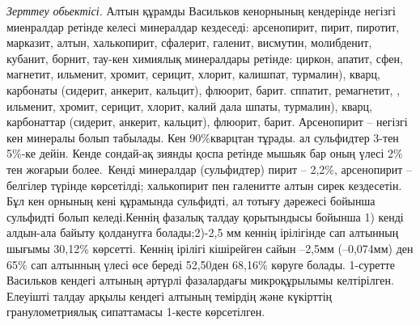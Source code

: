 \begin{multicols}{2}
\emph{Зерттеу обьектісі.} Алтын құрамды Васильков кенорнының кендерінде
негізгі миенралдар ретінде келесі минералдар кездеседі: арсенопирит,
пирит, пиротит, марказит, алтын, халькопирит, сфалерит, галенит,
висмутин, молибденит, кубанит, борнит, тау-кен химиялық минералдары
ретінде: циркон, апатит, сфен, магнетит, ильменит, хромит, серицит,
хлорит, калишпат, турмалин), кварц, карбонаты (сидерит, анкерит,
кальцит), флюорит, барит. сппатит, ремагнетит, , ильменит, хромит,
серицит, хлорит, калий дала шпаты, турмалин), кварц, карбонаттар
(сидерит, анкерит, кальцит), флюорит, барит. Арсенопирит -- негізгі кен
минералы болып табылады. Кен 90\%кварцтан тұрады. ал сульфидтер 3-тен
5\%-ке дейін. Кенде сондай-ақ зиянды қоспа ретінде мышьяк бар оның үлесі
2\% тен жоғарыи более.~Кенді минералдар (сульфидтер) пирит -- 2,2\%,
арсенопирит -- белгілер түрінде көрсетілді; халькопирит пен галенитте
алтын сирек кездесетін. Бұл кен орнының кені құрамында сульфидті, ал
тотығу дәрежесі бойынша сульфидті болып келеді.Кеннің фазалық талдау
қорытындысы бойынша 1) кенді алдын-ала байыту қолданугға болады;2)-2,5
мм кеннің ірілігінде сап алтынның шығымы 30,12\% көрсетті. Кеннің
ірілігі кішірейген сайын --2,5мм (--0,074мм) ден 65\% сап алтынның үлесі
өсе береді 52,50ден 68,16\% көруге болады. 1-суретте Васильков кендегі
алтының әртүрлі фазалардағы микроқұрылымы келтірілген. Елеуішті талдау
арқылы кендегі алтының темірдің және күкірттің гранулометриялық
сипаттамасы 1-кесте көрсетілген.
\end{multicols}

